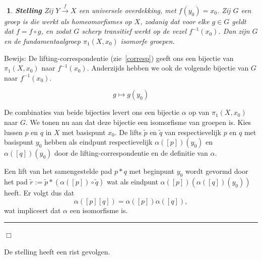 \documentclass[12pt]{book}
\newcommand{\Z}{\mathbb{Z}}
\newcommand{\bew}{{\sc Bewijs: }}
\newcommand{\B}{\rule{1mm}{0mm} \hfill $\Box$ }
\newcommand{\C}{\mathbb{C}}
\newtheorem{stelh}{$\!\!$}[section]
\newenvironment{stel}{\begin{stelh}{\em {\bf Stelling }}}{\end{stelh}}
\begin{document}
\begin{stel}\label{lift2}
Zij $Y\stackrel{f}{\to} X$ een universele overdekking, met $f(y_0) = x_0$. Zij $G$ een groep is die werkt als homeomorfismes op $X$, zodanig dat voor elke $g \in G$ geldt dat $f = f \circ g$,  en zodat $G$ scherp transitief werkt op de vezel $f^{-1}(x_0)$. Dan zijn $G$ en de fundamentaalgroep $\pi_1(X,x_0)$ isomorfe groepen. 
\end{stel}
\bew
De lifting-correspondentie (zie~\ref{corresp}) geeft ons een bijectie van  $\pi_1(X, x_0)$ naar $f^{-1}(x_0)$. Anderzijds hebben we ook de volgende bijectie van $G$ naar $f^{-1}(x_0)$.

$$
g \mapsto g(y_0)
$$

De combinaties van beide bijecties levert ons een bijectie $\alpha$ op van $\pi_1(X,x_0)$ naar $G$. We tonen nu aan dat deze bijectie een isomorfisme van groepen is. Kies lussen $p$ en $q$ in $X$ met basispunt $x_0$. De lifts $\widetilde{p}$ en $\widetilde{q}$ van respectievelijk $p$ en $q$ met basispunt $y_0$ hebben als eindpunt respectievelijk $\alpha([p])(y_0)$ en $\alpha([q])(y_0)$ door de lifting-correspondentie en de definitie van $\alpha$.

Een lift van het samengestelde pad $p * q$ met beginpunt $y_0$ wordt gevormd door het pad $\widetilde{r} :=\widetilde{p} * (\alpha([p]) \circ \widetilde{q})$ wat als eindpunt $\alpha([p]) (\alpha([q])(y_0))$ heeft. Er volgt dus dat 
$$
\alpha([p][q]) = \alpha([p])\alpha([q]) ,
$$
wat impliceert dat $\alpha$ een isomorfisme is. \B



%
%
%
%
%
%
%
%
%
%
%
%
De stelling heeft een rist gevolgen.
\end{document}
